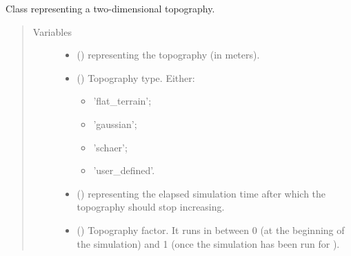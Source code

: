 \documentclass[letterpaper,10pt,english]{sphinxmanual}
\begin{document}
\begin{fulllineitems}
\label{\detokenize{api:grids.topography.Topography2d}}
Class representing a two-dimensional topography.
\begin{quote}\begin{description}
\item[{Variables}] \leavevmode\begin{itemize}
\item {} 
 () \textendash{}  representing the topography (in meters).

\item {} 
 () \textendash{} 
Topography type. Either:
\begin{itemize}
\item {} 
’flat\_terrain’;

\item {} 
’gaussian’;

\item {} 
’schaer’;

\item {} 
’user\_defined’.

\end{itemize}


\item {} 
 () \textendash{}  representing the elapsed simulation time after which the topography
should stop increasing.

\item {} 
 () \textendash{} Topography factor. It runs in between 0 (at the beginning of the simulation) and 1 (once the simulation
has been run for ).

\end{itemize}

\end{description}\end{quote}


\end{fulllineitems}
\end{document}
